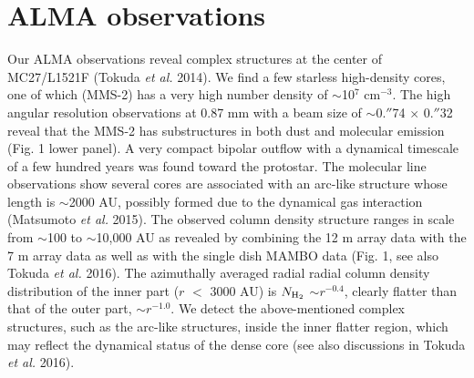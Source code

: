 \documentclass{article}
\begin{document}

\begin{abstract}
We present the results of ALMA observations of dust continuum emission and molecular rotational lines toward a dense core, MC27 (aka L1521F), which is considered to be very close to the first core phase. We revealed the spatial/velocity structures of the core are very complex and and suggest that the initial condition of star formation is highly dynamical.
\end{abstract}

\section{ALMA observations}
Our ALMA observations reveal complex structures at the center of MC27/L1521F (Tokuda {\it et al.} 2014). We find a few starless high-density cores, one of which (MMS-2) has a very high number density of $\sim$10$^7$ cm$^{-3}$. 
The high angular resolution observations at 0.87 mm with a beam size of $\sim$0.$''$74 $\times$ 0.$''$32 reveal that the MMS-2 has substructures in both dust and molecular emission (Fig. 1 lower panel).
A very compact bipolar outflow with a dynamical timescale of a few hundred years was found toward the protostar. 
The molecular line observations show several cores are associated with an arc-like structure whose length is $\sim$2000 AU, possibly formed due to the dynamical gas interaction (Matsumoto {\it et al.} 2015). 
The observed column density structure ranges in scale from $\sim$100 to $\sim$10,000 AU as revealed by
combining the 12 m array data with the 7 m array data as well as with the single dish MAMBO data (Fig. 1, see also Tokuda {\it et al.} 2016). 
The azimuthally averaged radial radial column density distribution of the inner part ($r$ $<$ 3000 AU) is $N_{\rm H_2}$ $\sim$$r^{-0.4}$, clearly flatter than that of the outer part, $\sim$$r^{-1.0}$. We detect the above-mentioned complex structures, such as the arc-like structures, inside the inner flatter region, which may reflect the dynamical status of the dense core (see also discussions in Tokuda {\it et al.} 2016). \\
\end{document}
